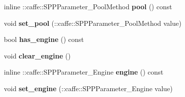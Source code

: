 \begin{DoxyCompactItemize}
inline \+::caffe\+::\+S\+P\+P\+Parameter\+\_\+\+Pool\+Method {\bfseries pool} () const
\item 
\mbox{\label{classcaffe_1_1_s_p_p_parameter_a83f47d9b65ea1c8bea0c45c73c0478aa}} 
void {\bfseries set\+\_\+pool} (\+::caffe\+::\+S\+P\+P\+Parameter\+\_\+\+Pool\+Method value)
\item 
\mbox{\label{classcaffe_1_1_s_p_p_parameter_ad49cdd5326153424e233f2b58027d740}} 
bool {\bfseries has\+\_\+engine} () const
\item 
\mbox{\label{classcaffe_1_1_s_p_p_parameter_a99fcbfcc5055ad8d2667e8aedfa2a7f3}} 
void {\bfseries clear\+\_\+engine} ()
\item 
\mbox{\label{classcaffe_1_1_s_p_p_parameter_a337579e2067d36a4a72bf933f2acc048}} 
inline \+::caffe\+::\+S\+P\+P\+Parameter\+\_\+\+Engine {\bfseries engine} () const
\item 
\mbox{\label{classcaffe_1_1_s_p_p_parameter_a369847647961c5fefe0fbcaf6bfdc586}} 
void {\bfseries set\+\_\+engine} (\+::caffe\+::\+S\+P\+P\+Parameter\+\_\+\+Engine value)
\end{DoxyCompactItemize}
